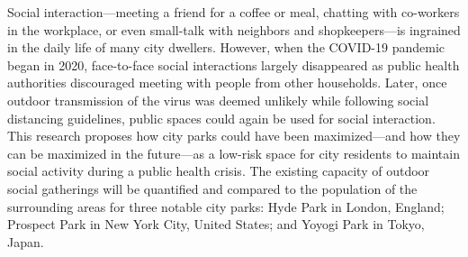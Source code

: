 \noindent Social interaction---meeting a friend for a coffee or meal, chatting with co-workers in the workplace, or even small-talk with neighbors and shopkeepers---is ingrained in the daily life of many city dwellers. However, when the COVID-19 pandemic began in 2020, face-to-face social interactions largely disappeared as public health authorities discouraged meeting with people from other households. Later, once outdoor transmission of the virus was deemed unlikely while following social distancing guidelines, public spaces could again be used for social interaction. This research proposes how city parks could have been maximized---and how they can be maximized in the future---as a low-risk space for city residents to maintain social activity during a public health crisis. The existing capacity of outdoor social gatherings will be quantified and compared to the population of the surrounding areas for three notable city parks: Hyde Park in London, England; Prospect Park in New York City, United States; and Yoyogi Park in Tokyo, Japan. 

